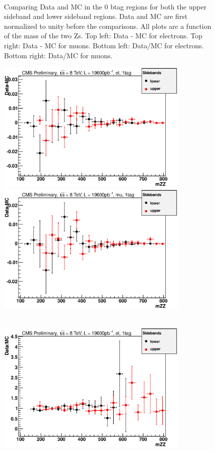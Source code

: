 \begin{figure}[htb!]
{\\
}
\caption{Comparing Data and MC in the 0 btag regions for both the upper sideband and lower sideband regions. Data and MC are first normalized to unity before the comparisons. All plots are a function of the mass of the two Zs. Top left: Data - MC for electrons.  Top right: Data - MC for muons.  Bottom left: Data/MC for electrons.  Bottom right: Data/MC for muons.
\label{fig:0tag_sideband_up_down}}  
\end{figure}
\begin{figure}[htb!]
\centerline{
\includegraphics[height=2.5in]{Systematics/plots/subtract_el_2_1}
\includegraphics[height=2.5in]{Systematics/plots/subtract_mu_2_1}}
\centerline{
\\
\includegraphics[height=2.5in]{Systematics/plots/divide_el_2_1}
}
\end{figure}
